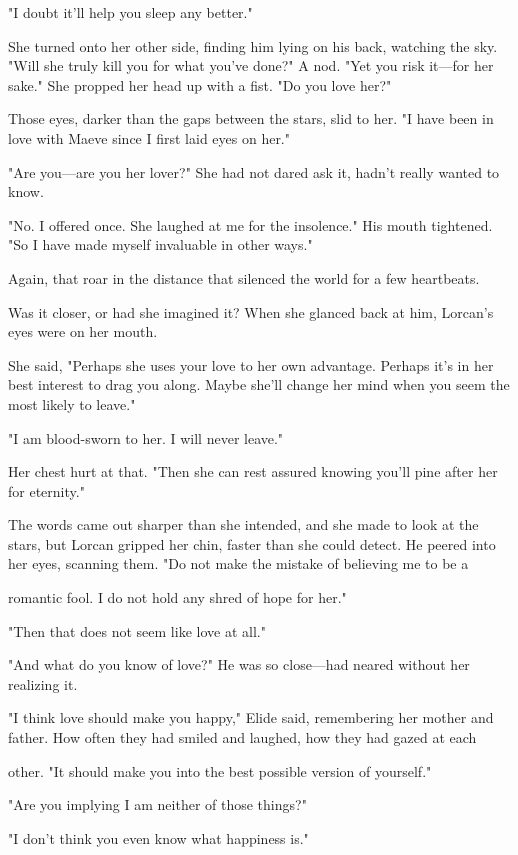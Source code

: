 "I doubt it'll help you sleep any better."

She turned onto her other side, finding him lying on his back, watching the sky. "Will she truly kill you for what you've done?" A nod. "Yet you risk it---for her sake." She propped her head up with a fist. "Do you love her?"

Those eyes, darker than the gaps between the stars, slid to her. "I have been in love with Maeve since I first laid eyes on her."

"Are you---are you her lover?" She had not dared ask it, hadn't really wanted to know.

"No. I offered once. She laughed at me for the insolence." His mouth tightened. "So I have made myself invaluable in other ways."

Again, that roar in the distance that silenced the world for a few heartbeats.

Was it closer, or had she imagined it? When she glanced back at him, Lorcan's eyes were on her mouth.

She said, "Perhaps she uses your love to her own advantage. Perhaps it's in her best interest to drag you along. Maybe she'll change her mind when you seem the most likely to  leave."

"I am blood-sworn to her. I will never leave."

Her chest hurt at that. "Then she can rest assured knowing you'll pine after her for eternity."

The words came out sharper than she intended, and she made to look at the stars, but Lorcan gripped her chin, faster than she could detect. He peered into her eyes, scanning them. "Do not make the mistake of believing me to be a

romantic fool. I do not hold any shred of hope for her."

"Then that does not seem like love at all."

"And what do you know of love?" He was so close---had neared without her realizing it.

"I think love should make you happy," Elide said, remembering her mother and father. How often they had smiled and laughed, how they had gazed at each

other. "It should make you into the best possible version of yourself."

"Are you implying I am neither of those things?"

"I don't think you even know what happiness is."

